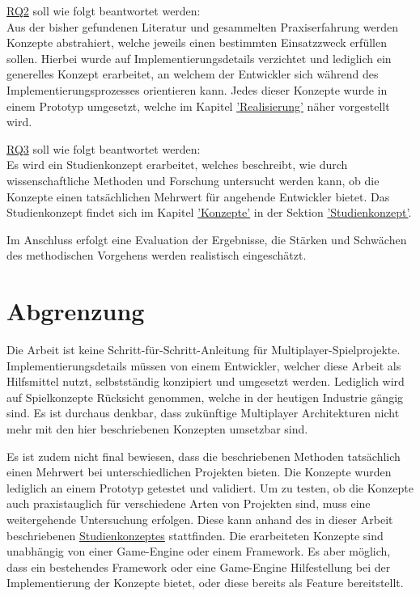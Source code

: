 \hyperref[RQ2]{RQ2} soll wie folgt beantwortet werden: \\
Aus der bisher gefundenen Literatur und gesammelten Praxiserfahrung werden Konzepte abstrahiert, welche jeweils einen bestimmten Einsatzzweck erfüllen sollen. Hierbei wurde auf Implementierungsdetails verzichtet und lediglich ein generelles Konzept erarbeitet, an welchem der Entwickler sich während des Implementierungsprozesses orientieren kann. Jedes dieser Konzepte wurde in einem Prototyp umgesetzt, welche im Kapitel \hyperref[sec:realisierung]{'Realisierung'} näher vorgestellt wird.

\hyperref[RQ3]{RQ3} soll wie folgt beantwortet werden: \\
Es wird ein Studienkonzept erarbeitet, welches beschreibt, wie durch wissenschaftliche Methoden und Forschung untersucht werden kann, ob die Konzepte einen tatsächlichen Mehrwert für angehende Entwickler bietet. Das Studienkonzept findet sich im Kapitel \hyperref[sec:konzepte]{'Konzepte'} in der Sektion \hyperref[studienkonzept]{'Studienkonzept'}.

Im Anschluss erfolgt eine Evaluation der Ergebnisse, die Stärken und Schwächen des methodischen Vorgehens werden realistisch eingeschätzt.

\section{Abgrenzung}

Die Arbeit ist keine Schritt-für-Schritt-Anleitung für Multiplayer-Spielprojekte. Implementierungsdetails müssen von einem Entwickler, welcher diese Arbeit als Hilfsmittel nutzt, selbstständig konzipiert und umgesetzt werden. Lediglich wird auf Spielkonzepte Rücksicht genommen, welche in der heutigen Industrie gängig sind. Es ist durchaus denkbar, dass zukünftige Multiplayer Architekturen nicht mehr mit den hier beschriebenen Konzepten umsetzbar sind.

Es ist zudem nicht final bewiesen, dass die beschriebenen Methoden tatsächlich einen Mehrwert bei unterschiedlichen Projekten bieten. Die Konzepte wurden lediglich an einem Prototyp getestet und validiert. Um zu testen, ob die Konzepte auch praxistauglich für verschiedene Arten von Projekten sind, muss eine weitergehende Untersuchung erfolgen. Diese kann anhand des in dieser Arbeit beschriebenen \hyperref[studienkonzept]{Studienkonzeptes} stattfinden. Die erarbeiteten Konzepte sind unabhängig von einer Game-Engine oder einem Framework. Es aber möglich, dass ein bestehendes Framework oder eine Game-Engine Hilfestellung bei der Implementierung der Konzepte bietet, oder diese bereits als Feature bereitstellt.

